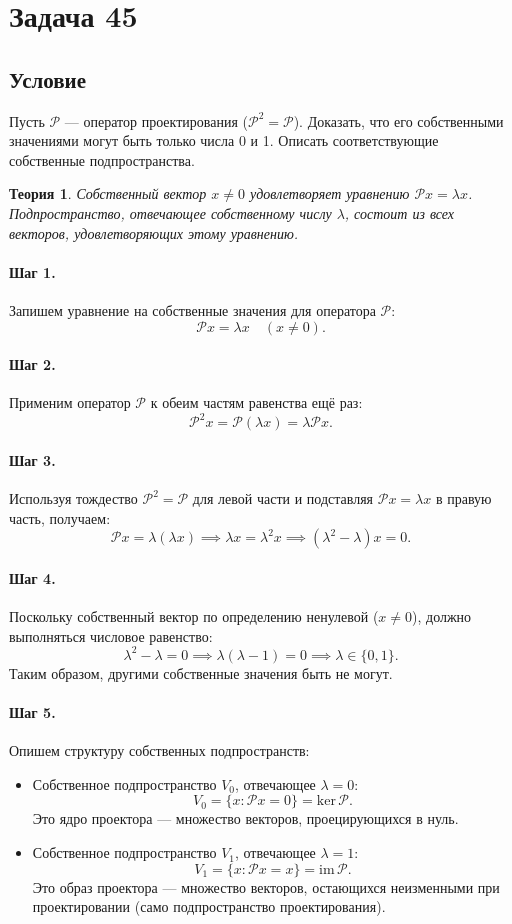 \documentclass[12pt,a4paper]{article}
\theoremstyle{solution}
\newtheorem*{theory}{Теория}
\newcommand{\task}[1]{\newpage\section*{Задача #1}}
\newcommand{\step}[1]{\paragraph{Шаг #1.}}
\begin{document}
\task{45}
\subsection*{Условие}
Пусть $\mathcal{P}$ — оператор проектирования ($\mathcal{P}^2 = \mathcal{P}$). Доказать, что его собственными значениями могут быть только числа 0 и 1. Описать соответствующие собственные подпространства.

\begin{theory}
Собственный вектор $x \neq 0$ удовлетворяет уравнению $\mathcal{P}x = \lambda x$. Подпространство, отвечающее собственному числу $\lambda$, состоит из всех векторов, удовлетворяющих этому уравнению.
\end{theory}

\step{1} Запишем уравнение на собственные значения для оператора $\mathcal{P}$:
\[
\mathcal{P}x = \lambda x \quad (x \neq 0).
\]

\step{2} Применим оператор $\mathcal{P}$ к обеим частям равенства ещё раз:
\[
\mathcal{P}^2 x = \mathcal{P}(\lambda x) = \lambda \mathcal{P}x.
\]

\step{3} Используя тождество $\mathcal{P}^2 = \mathcal{P}$ для левой части и подставляя $\mathcal{P}x = \lambda x$ в правую часть, получаем:
\[
\mathcal{P}x = \lambda (\lambda x) \implies \lambda x = \lambda^2 x \implies (\lambda^2 - \lambda)x = 0.
\]

\step{4} Поскольку собственный вектор по определению ненулевой ($x \neq 0$), должно выполняться числовое равенство:
\[
\lambda^2 - \lambda = 0 \implies \lambda(\lambda - 1) = 0 \implies \lambda \in \{0, 1\}.
\]
Таким образом, другими собственные значения быть не могут.

\step{5} Опишем структуру собственных подпространств:
\begin{itemize}
    \item Собственное подпространство $V_0$, отвечающее $\lambda = 0$:
    \[
    V_0 = \{x : \mathcal{P}x = 0\} = \mathrm{ker}\,\mathcal{P}.
    \]
    Это ядро проектора — множество векторов, проецирующихся в нуль.
    \item Собственное подпространство $V_1$, отвечающее $\lambda = 1$:
    \[
    V_1 = \{x : \mathcal{P}x = x\} = \mathrm{im}\,\mathcal{P}.
    \]
    Это образ проектора — множество векторов, остающихся неизменными при проектировании (само подпространство проектирования).
\end{itemize}
\end{document}
